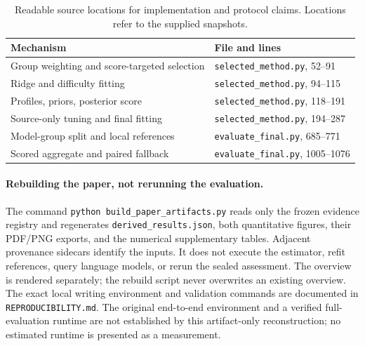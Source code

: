 \documentclass{article}
\begin{document}
\begin{table}[h]
\centering\small
\caption{Readable source locations for implementation and protocol claims. Locations refer to the supplied snapshots.}
\label{tab:locations}
\begin{tabular}{ll}
\toprule
Mechanism & File and lines\\
\midrule
Group weighting and score-targeted selection & \texttt{selected\_method.py}, 52--91\\
Ridge and difficulty fitting & \texttt{selected\_method.py}, 94--115\\
Profiles, priors, posterior score & \texttt{selected\_method.py}, 118--191\\
Source-only tuning and final fitting & \texttt{selected\_method.py}, 194--287\\
Model-group split and local references & \texttt{evaluate\_final.py}, 685--771\\
Scored aggregate and paired fallback & \texttt{evaluate\_final.py}, 1005--1076\\
\bottomrule
\end{tabular}
\end{table}

\paragraph{Rebuilding the paper, not rerunning the evaluation.}
The command \texttt{python build\_paper\_artifacts.py} reads only the frozen evidence registry and regenerates \texttt{derived\_results.json}, both quantitative figures, their PDF/PNG exports, and the numerical supplementary tables. Adjacent provenance sidecars identify the inputs. It does not execute the estimator, refit references, query language models, or rerun the sealed assessment. The overview is rendered separately; the rebuild script never overwrites an existing overview. The exact local writing environment and validation commands are documented in \texttt{REPRODUCIBILITY.md}. The original end-to-end environment and a verified full-evaluation runtime are not established by this artifact-only reconstruction; no estimated runtime is presented as a measurement.
\end{document}
